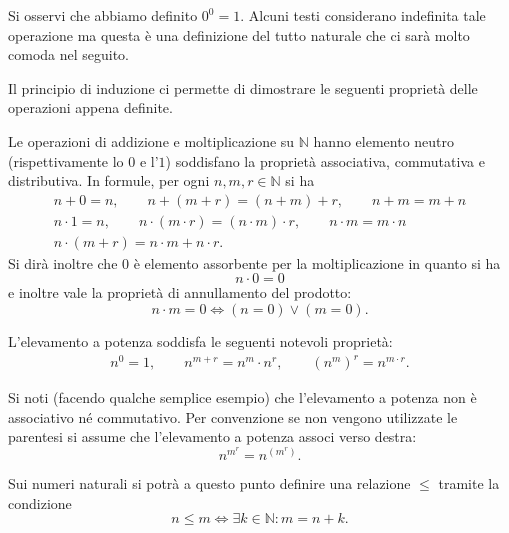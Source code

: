 \documentclass[italian,a4paper,twosides,headinclude]{scrbook}
\newcommand{\NN}{\mathbb N}
\begin{document}
Si osservi che abbiamo definito $0^0=1$.
Alcuni testi considerano indefinita tale operazione ma
questa è una definizione del tutto naturale che ci sarà molto comoda nel seguito.

Il principio di induzione ci permette di dimostrare le seguenti proprietà delle
operazioni appena definite.

\begin{theorem}
Le operazioni di addizione e moltiplicazione su $\NN$ hanno elemento neutro
(rispettivamente lo $0$ e l'$1$) soddisfano la proprietà associativa, commutativa
e distributiva. In formule, per ogni $n,m,r\in \NN$ si ha
\begin{gather*}
  n+0= n, \qquad n+(m+r) = (n+m)+r, \qquad n+m=m+n\\
  n\cdot 1 = n, \qquad n\cdot(m\cdot r) = (n\cdot m)\cdot r, \qquad n\cdot m=m\cdot n\\
  n\cdot(m+r) = n\cdot m + n \cdot r.
\end{gather*}
Si dirà inoltre che $0$ è elemento assorbente per la moltiplicazione in quanto si ha
\[
   n\cdot 0 = 0
\]
e inoltre vale la proprietà di annullamento del prodotto:
\[
  n\cdot m = 0 \iff (n=0)\lor(m=0).
\]

L'elevamento a potenza soddisfa le seguenti notevoli proprietà:
\begin{gather*}
n^0 = 1, \qquad
n^{m+r} = n^m \cdot n^r, \qquad
(n^m)^r = n^{m\cdot r}.
\end{gather*}
\end{theorem}

Si noti (facendo qualche semplice esempio)
che l'elevamento a potenza non è associativo né commutativo. Per
convenzione se non vengono utilizzate le parentesi si assume che l'elevamento
a potenza associ verso destra:
\[
  n^{m^r} = n^{(m^r)}.
\]

Sui numeri naturali
si potrà a questo punto definire una relazione $\le$ tramite la condizione
\[
  n \le m \iff \exists k \in \NN \colon m = n+k.
\]
\end{document}
